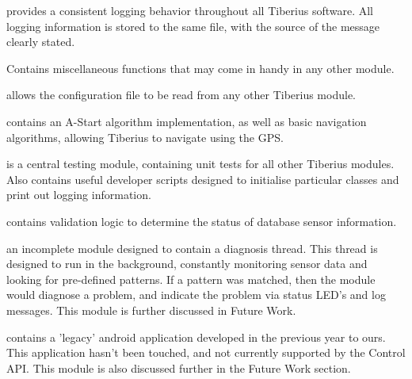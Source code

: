 \begin{description}[align=left]
\item [Logging] provides a consistent logging behavior throughout all Tiberius software. All logging information is stored to the same file, with the source of the message clearly stated.

\item [Utilities] Contains miscellaneous functions that may come in handy in any other module.

\item [Configuration] allows the configuration file to be read from any other Tiberius module. 

\item [Navigation] contains an A-Start algorithm implementation, as well as basic navigation algorithms, allowing Tiberius to navigate using the GPS.

\item [Testing] is a central testing module, containing unit tests for all other Tiberius modules. Also contains useful developer scripts designed to initialise particular classes and print out logging information.

\item [Validation] contains validation logic to determine the status of database sensor information.

\item [Diagnostics] an incomplete module designed to contain a diagnosis thread. This thread is designed to run in the background, constantly monitoring sensor data and looking for pre-defined patterns. If a pattern was matched, then the module would diagnose a problem, and indicate the problem via status LED's and log messages. This module is further discussed in Future Work.

\item [Android Control]contains a 'legacy' android application developed in the previous year to ours. This application hasn't been touched, and not currently supported by the Control API. This module is also discussed further in the Future Work section.

\end{description}